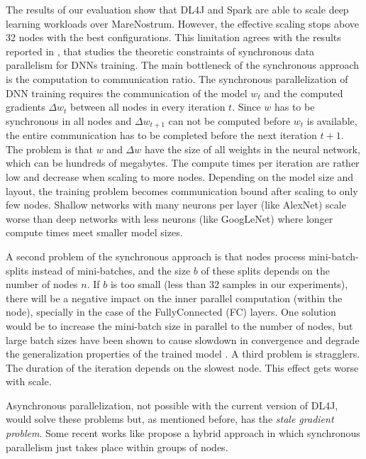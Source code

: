 \documentclass[journal]{IEEEtran}
\begin{document}
The results of our evaluation show that DL4J and Spark are able to scale deep learning workloads over MareNostrum. However, the effective scaling stops above 32 nodes with the best configurations. This limitation agrees with the results reported in \cite{DBLP:conf/sc/KeuperP16}, that studies the theoretic constraints of synchronous data parallelism for DNNs training. The main bottleneck of the synchronous approach is the computation to communication ratio. The synchronous parallelization of DNN training requires the communication of the model $w_t$ and the computed gradients $\Delta w_t$ between all nodes in every iteration $t$. Since $w$ has to be synchronous in all nodes and $\Delta w_{t+1}$ can not be computed before $w_t$ is available, the entire communication has to be completed before the next iteration $t+1$. The problem is that $w$ and $\Delta w$ have the size of all weights in the
neural network, which can be hundreds of megabytes. The compute times per iteration 
are rather low and decrease when scaling to more nodes. Depending on the model size and layout, the training problem becomes communication bound after scaling to only few nodes. Shallow networks with many neurons per layer (like AlexNet) scale worse than deep networks with less neurons (like GoogLeNet) where longer compute times meet smaller model sizes.

A second problem of the synchronous approach is that nodes process mini-batch-splits instead of mini-batches, and the size $b$ of these splits depends on the number of nodes $n$. If $b$ is too small (less than 32 samples in our experiments), there will be a negative impact on the inner parallel computation (within the node), specially in the case of the FullyConnected (FC) layers. One solution would be to increase the mini-batch size in parallel to the number of nodes, but large batch sizes have been shown to cause slowdown in convergence and degrade the generalization properties of the trained model \cite{DBLP:journals/corr/abs-1708-05256}. A third problem is stragglers. The duration of the iteration depends on the slowest node. This effect gets worse with scale.

Asynchronous parallelization, not possible with the current version of DL4J, would solve these problems but, as mentioned before, has the {\it stale gradient problem}. Some recent works like \cite{DBLP:journals/corr/abs-1708-05256} propose a hybrid approach in which synchronous parallelism just takes place within groups of nodes. 

\end{document}
